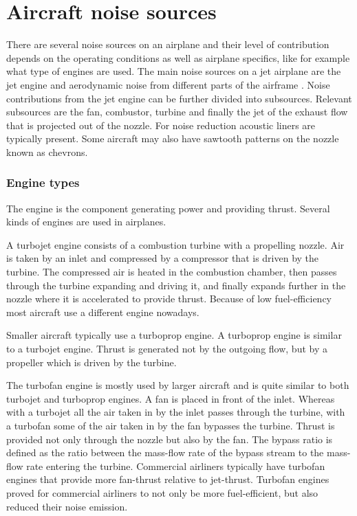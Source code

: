 \section{Aircraft noise sources}

%

There are several noise sources on an airplane and their level of contribution
depends on the operating conditions as well as airplane specifics, like for example what type of engines are
used. The main noise sources on a jet airplane are the jet engine and
aerodynamic noise from different parts of the airframe \cite{Zaporozhets2011}.
Noise contributions from the jet engine can be further divided into subsources.
Relevant subsources are the fan, combustor, turbine and finally the jet of the
exhaust flow that is projected out of the nozzle.
For noise reduction acoustic liners are typically present.
Some aircraft may also have sawtooth patterns on the nozzle known as chevrons.

\subsubsection{Engine types}
The engine is the component generating power and providing thrust. Several kinds
of engines are used in airplanes.

A turbojet engine consists of a combustion turbine with a propelling nozzle. Air
is taken by an inlet and compressed by a compressor that is driven by the
turbine. The compressed air is heated in the combustion chamber, then passes
through the turbine expanding and driving it, and finally expands further in the
nozzle where it is accelerated to provide thrust. Because of low fuel-efficiency
most aircraft use a different engine nowadays.

Smaller aircraft typically use a turboprop engine. A turboprop engine is similar
to a turbojet engine. Thrust is generated not by the outgoing flow, but by a
propeller which is driven by the turbine.

The turbofan engine is mostly used by larger aircraft and is quite similar to
both turbojet and turboprop engines. A fan is placed in front of the inlet.
Whereas with a turbojet all the air taken in by the inlet passes through the
turbine, with a turbofan some of the air taken in by the fan bypasses the
turbine. Thrust is provided not only through the nozzle but also by the fan. The
bypass ratio is defined as the ratio between the mass-flow rate of the bypass stream
to the mass-flow rate entering the turbine. Commercial airliners typically have
 turbofan engines that provide more fan-thrust relative to
jet-thrust. Turbofan engines proved for commercial airliners to not only be more
fuel-efficient, but also reduced their noise emission.

